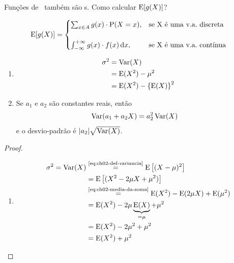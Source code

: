 Funções de \va\ também são \va s. Como calcular $\operatorname{E}[g(X)]$?

\begin{result}
    \begin{align}
        \operatorname{E}[g(X)] &= \begin{cases}
            \sum_{x \in A} g(x)\cdot\operatorname{P}(X = x),
            & \text{se X é uma v.a.\ discreta} \\
            \\
            \int_{-\infty}^{+\infty} g(x)\cdot f(x) \,\mathrm{d} x,
            & \text{se X é uma v.a.\ contínua}
        \end{cases}
        \label{eq:ch02-espeanca-funcao-va}
    \end{align}
\end{result}

\begin{property}
    \label{prop:ch02-variancia}
    \begin{enumerate}
        \item \begin{align}
            \sigma^2 &= \operatorname{Var}(X) \notag \\
            &= \operatorname{E}(X^2) - \mu^2 \notag \\
            &= \operatorname{E}(X^2) - \left\{\operatorname{E}(X)\right\}^2
            \label{it:ch02-variancia-momentos}
        \end{align}
        \item Se $a_1$ e $a_2$ são constantes reais, então
        \begin{align}
            \operatorname{Var}(a_1 + a_2 X) &= a_2^2\operatorname{Var}(X)
            \label{it:ch02-variancia-constantes-reais}
        \end{align}
        e o desvio-padrão é $|a_2|\sqrt{\operatorname{Var}(X)}$.
    \end{enumerate}

    \begin{proof}
        \begin{enumerate}
            \item \begin{align*}
                \sigma^2 = \Var(X)
                &\overset{\text{\Cref{eq:ch02-def-variancia}}}{=}
                \Expected\left[(X-\mu)^2\right] \\
                &= \Expected\left[(X^2-2\mu X + \mu^2)\right] \\
                &\overset{\text{\Cref{eq:ch02-media-da-soma}}}{=}
                \Expected(X^2)
                    -\Expected(2\mu X)
                    + \Expected(\mu^2) \\
                &= \Expected(X^2)
                    - 2\mu\underbrace{\Expected(X)}_{=\mu}
                    + \mu^2 \\
                &= \Expected(X^2) - 2\mu^2 + \mu^2 \\
                &= \Expected(X^2) + \mu^2
            \end{align*}


\end{enumerate}
\end{proof}
\end{property}
